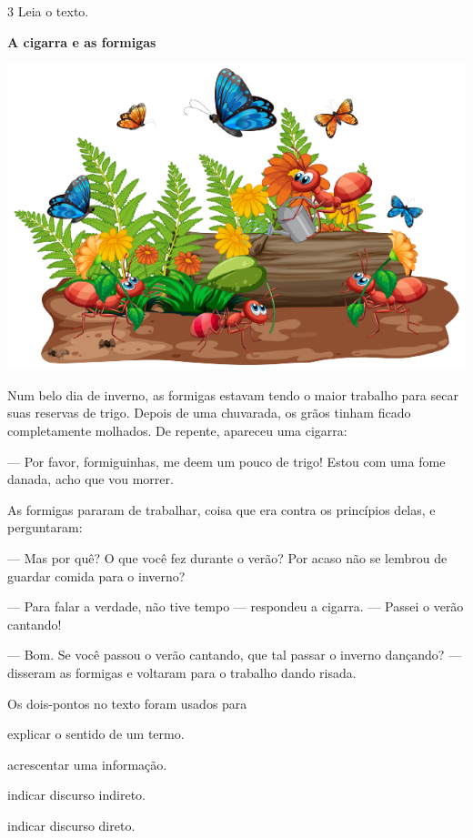 \pagebreak
\num{3} Leia o texto.

\begin{myquote}
\textbf{A cigarra e as formigas}

\begin{center}
\includegraphics[width=\textwidth]{./media/image23r.png}
\end{center}

Num belo dia de inverno, as formigas estavam tendo o maior
trabalho para secar suas reservas de trigo. Depois de uma
chuvarada, os grãos tinham ficado completamente molhados. De
repente, apareceu uma cigarra:

--- Por favor, formiguinhas, me deem um pouco de
trigo! Estou com uma fome danada, acho que vou morrer.

As formigas pararam de trabalhar, coisa que era contra
os princípios delas, e perguntaram:

--- Mas por quê? O que você fez durante o verão? Por
acaso não se lembrou de guardar comida para o inverno?

--- Para falar a verdade, não tive tempo --- respondeu
a cigarra. --- Passei o verão cantando!

--- Bom. Se você passou o verão cantando, que tal
passar o inverno dançando? --- disseram as formigas e
voltaram para o trabalho dando risada.

\end{myquote}

Os dois-pontos no texto foram usados para

\begin{escolha}
\item explicar o sentido de um termo.

\item acrescentar uma informação.

\item indicar discurso indireto.

\item indicar discurso direto.
\end{escolha}

